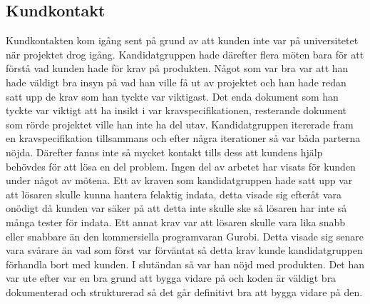 \subsection{Kundkontakt}
Kundkontakten kom igång sent på grund av att kunden inte var på universitetet när projektet drog igång. Kandidatgruppen hade därefter flera möten bara för att förstå vad kunden hade för krav på produkten. Något som var bra var att han hade väldigt bra insyn på vad han ville få ut av projektet och han hade redan satt upp de krav som han tyckte var viktigast. Det enda dokument som han tyckte var viktigt att ha insikt i var kravspecifikationen, resterande dokument som rörde projektet ville han inte ha del utav. Kandidatgruppen itererade fram en kravspecifikation tillsammans och efter några iterationer så var båda parterna nöjda. Därefter fanns inte så mycket kontakt tills dess att kundens hjälp behövdes för att lösa en del problem. Ingen del av arbetet har visats för kunden under något av mötena. 
\newline
\newline
Ett av kraven som kandidatgruppen hade satt upp var att lösaren skulle kunna hantera felaktig indata, detta visade sig efteråt vara onödigt då kunden var säker på att detta inte skulle ske så lösaren har inte så många tester för indata. Ett annat krav var att lösaren skulle vara lika snabb eller snabbare än den kommersiella programvaran Gurobi. Detta visade sig senare vara svårare än vad som först var förväntat så detta krav kunde kandidatgruppen förhandla bort med kunden. I slutändan så var han nöjd med produkten. Det han var ute efter var en bra grund att bygga vidare på och koden är väldigt bra dokumenterad och strukturerad så det går definitivt bra att bygga vidare på den. 

